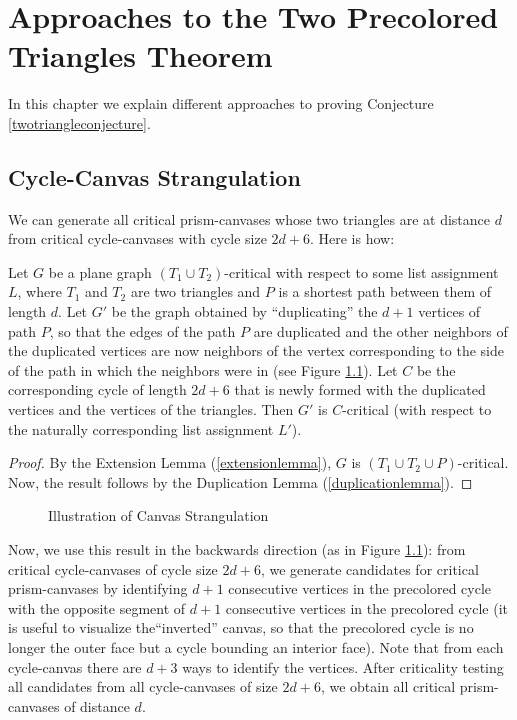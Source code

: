 \chapter{Approaches to the Two Precolored Triangles Theorem}

In this chapter we explain different approaches to proving Conjecture \ref{twotriangleconjecture}.

\section{Cycle-Canvas Strangulation}

We can generate all critical prism-canvases whose two triangles are at distance $d$ from critical
cycle-canvases with cycle size $2d+6$. Here is how:


\begin{proposition}
Let $G$ be a plane graph $(T_1 \cup T_2)$-critical with respect to some list assignment $L$, 
where $T_1$ and $T_2$ are two triangles 
and $P$ is a shortest path between them of length $d$. Let $G'$ be the graph
obtained by ``duplicating'' the $d+1$ vertices of path $P$, so that the edges of the path $P$ are
duplicated and the other neighbors of the duplicated vertices are now neighbors of the vertex
corresponding to the side of the path in which the neighbors were in (see Figure 
\ref{fig:strangulation}). Let $C$ be the corresponding cycle of length $2d+6$ that is newly formed
with the duplicated vertices and the vertices of the triangles. Then $G'$ is $C$-critical (with 
respect to the naturally corresponding list assignment $L'$).
\end{proposition}
\begin{proof}
By the Extension Lemma (\ref{extensionlemma}), $G$ is $(T_1 \cup T_2 \cup P)$-critical.
Now, the result follows by the Duplication Lemma (\ref{duplicationlemma}).
\end{proof}

\begin{figure}
\label{fig:strangulation}
\caption{Illustration of Canvas Strangulation}
\end{figure}

Now, we use this result in the backwards direction (as in Figure \ref{fig:strangulation}):
from critical cycle-canvases of cycle size $2d+6$, we generate candidates for critical 
prism-canvases by identifying $d+1$ consecutive vertices in the precolored cycle with the opposite
segment of $d+1$ consecutive vertices in the precolored cycle (it is useful to visualize 
the``inverted'' canvas, so that the precolored cycle is no longer the outer face but a cycle
bounding an interior face). Note that from each cycle-canvas there are $d+3$ ways to identify
the vertices. After criticality testing all candidates from all cycle-canvases of size $2d+6$, we
obtain all critical prism-canvases of distance $d$.

